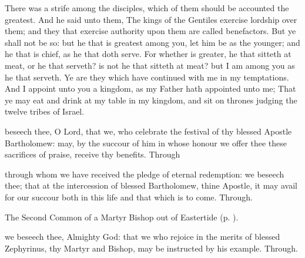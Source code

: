 
 There was a strife among the disciples, which of them should be accounted the greatest. And he said unto them, The kings of the Gentiles exercise lordship over them; and they that exercise authority upon them are called benefactors. But ye shall not be so: but he that is greatest among you, let him be as the younger; and he that is chief, as he that doth serve. For whether is greater, he that sitteth at meat, or he that serveth? is not he that sitteth at meat? but I am among you as he that serveth. Ye are they which have continued with me in my temptations. And I appoint unto you a kingdom, as my Father hath appointed unto me; That ye may eat and drink at my table in my kingdom, and sit on thrones judging the twelve tribes of Israel.


\secret
{} beseech thee, O Lord, that we, who celebrate the festival of thy blessed Apostle Bartholomew: may, by the succour of him in whose honour we offer thee these sacrifices of praise, receive thy benefits. Through


\postcommunion
{} through whom we have received the pledge of eternal redemption: we beseech thee; that at the intercession of blessed Bartholomew, thine Apostle, it may avail for our succour both in this life and that which is to come. Through.



\begin{rubric}
	The Second Common of a Martyr Bishop out of Eastertide (p. \pageref{CommonMartyrBishopII}).
\end{rubric}

\collect
{} we beseech thee, Almighty God: that we who rejoice in the merits of blessed Zephyrinus, thy Martyr and Bishop, may be instructed by his example. Through.

